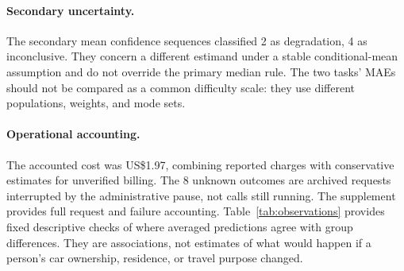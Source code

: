 \paragraph{Secondary uncertainty.} The secondary mean confidence sequences classified 2 as degradation, 4 as inconclusive. They concern a different estimand under a stable conditional-mean assumption and do not override the primary median rule. The two tasks' MAEs should not be compared as a common difficulty scale: they use different populations, weights, and mode sets.

\paragraph{Operational accounting.} The accounted cost was US\$1.97, combining reported charges with conservative estimates for unverified billing. The 8 unknown outcomes are archived requests interrupted by the administrative pause, not calls still running. The supplement provides full request and failure accounting. Table~\ref{tab:observations} provides fixed descriptive checks of where averaged predictions agree with group differences. They are associations, not estimates of what would happen if a person's car ownership, residence, or travel purpose changed.
